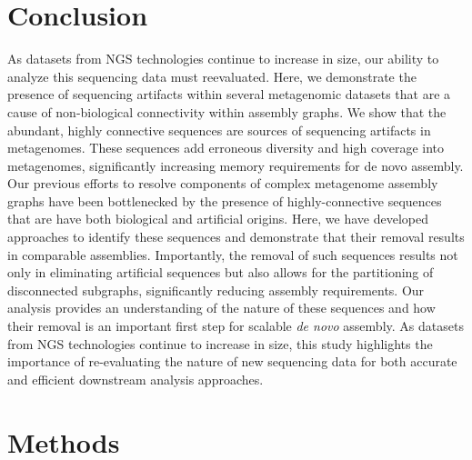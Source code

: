 \documentclass[11pt]{article} %
\begin{document}
\section{Conclusion}

As datasets from NGS technologies continue to increase in size, our ability to analyze this sequencing data must reevaluated.  Here, we demonstrate the presence of sequencing artifacts within several metagenomic datasets that are a cause of non-biological connectivity within assembly graphs.  We show that the abundant, highly connective sequences are sources of sequencing artifacts in metagenomes.  These sequences add erroneous diversity and high coverage into metagenomes, significantly increasing memory requirements for de novo assembly.  Our previous efforts to resolve components of complex metagenome assembly graphs have been bottlenecked by the presence of highly-connective sequences that are have both biological and artificial origins.  Here, we have developed approaches to identify these sequences and demonstrate that their removal results in comparable assemblies.  Importantly, the removal of such sequences results not only in eliminating artificial sequences but also allows for the partitioning of disconnected subgraphs, significantly reducing assembly requirements.  Our analysis provides an understanding of the nature of these sequences and how their removal is an important first step for scalable \emph{de novo} assembly.  As datasets from NGS technologies continue to increase in size, this study highlights the importance of re-evaluating the nature of new sequencing data for both accurate and efficient downstream analysis approaches. 

\section{Methods}
\end{document}

